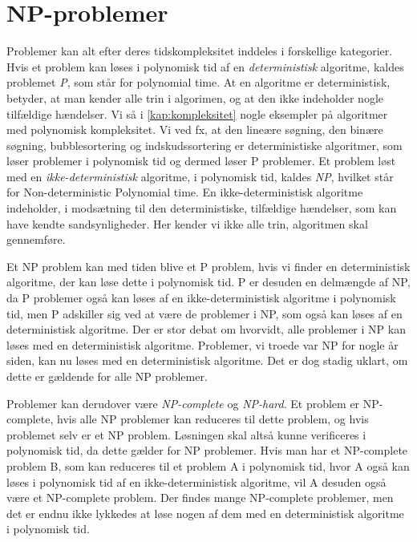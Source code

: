 \section{NP-problemer} \label{kap:np}
Problemer kan alt efter deres tidskompleksitet inddeles i forskellige kategorier. Hvis et problem kan løses i polynomisk tid af en \emph{deterministisk} algoritme, kaldes problemet \emph{P}, som står for polynomial time.
At en algoritme er deterministisk, betyder, at man kender alle trin i algorimen, og at den ikke indeholder nogle tilfældige hændelser. Vi så i \autoref{kap:kompleksitet} nogle eksempler på algoritmer med polynomisk kompleksitet. Vi ved fx, at den lineære søgning, den binære søgning, bubblesortering og indskudssortering er deterministiske algoritmer, som løser problemer i polynomisk tid og dermed løser P problemer. 
Et problem løst med en \emph{ikke-deterministisk} algoritme, i polynomisk tid, kaldes \emph{NP}, hvilket står for Non-deterministic Polynomial time. En ikke-deterministisk algoritme indeholder, i modsætning til den deterministiske, tilfældige hændelser, som kan have kendte sandsynligheder. Her kender vi ikke alle trin, algoritmen skal gennemføre. 

Et NP problem kan med tiden blive et P problem, hvis vi finder en deterministisk algoritme, der kan løse dette i polynomisk tid. P er desuden en delmængde af NP, da P problemer også kan løses af en ikke-deterministisk algoritme i polynomisk tid, men P adskiller sig ved at være de problemer i NP, som også kan løses af en deterministisk algoritme. 
Der er stor debat om hvorvidt, alle problemer i NP kan løses med en deterministisk algoritme. Problemer, vi troede var NP for nogle år siden, kan nu løses med en deterministisk algoritme. Det er dog stadig uklart, om dette er gældende for alle NP problemer.


Problemer kan derudover være \emph{NP-complete} og \emph{NP-hard}. Et problem er NP-complete, hvis alle NP problemer kan reduceres til dette problem, og hvis problemet selv er et NP problem. Løsningen skal altså kunne verificeres i polynomisk tid, da dette gælder for NP problemer. Hvis man har et NP-complete problem B, som kan reduceres til et problem A i polynomisk tid, hvor A også kan løses i polynomisk tid af en ikke-deterministisk algoritme, vil A desuden også være et NP-complete problem. Der findes mange NP-complete problemer, men det er endnu ikke lykkedes at løse nogen af dem med en deterministisk algoritme i polynomisk tid.

